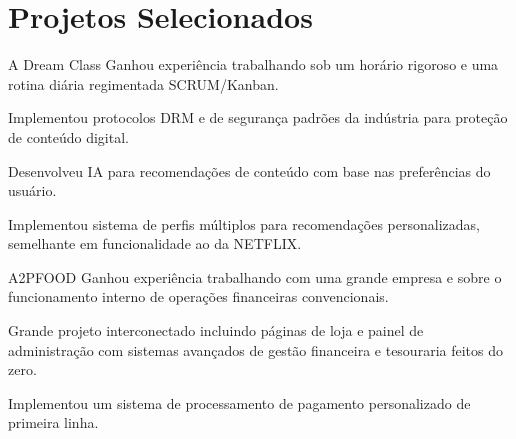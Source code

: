 \section{Projetos Selecionados}

\begin{experience}{A Dream Class}{
}
Ganhou experiência trabalhando sob um horário rigoroso e uma rotina diária regimentada SCRUM/Kanban.

\begin{contribs}
	\item{Implementou protocolos DRM e de segurança padrões da indústria para proteção de conteúdo digital.}
	\item{Desenvolveu IA para recomendações de conteúdo com base nas preferências do usuário.}
    \item{Implementou sistema de perfis múltiplos para recomendações personalizadas, semelhante em funcionalidade ao da NETFLIX.}
\end{contribs}
\end{experience}

\begin{experience}{A2PFOOD}{
}
Ganhou experiência trabalhando com uma grande empresa e sobre o funcionamento interno de operações financeiras convencionais.

\begin{contribs}
	\item{Grande projeto interconectado incluindo páginas de loja e painel de administração com sistemas avançados de gestão financeira e tesouraria feitos do zero.}
	\item{Implementou um sistema de processamento de pagamento personalizado de primeira linha.}
\end{contribs}
\end{experience}
